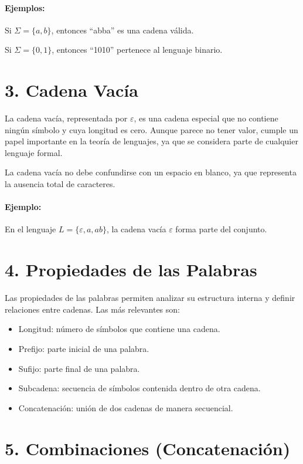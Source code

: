 \documentclass{article}
\begin{document}
\paragraph{Ejemplos:}

Si $\Sigma = \{a, b\}$, entonces ``abba'' es una cadena válida.

Si $\Sigma = \{0, 1\}$, entonces ``1010'' pertenece al lenguaje binario.

\section{3. Cadena Vacía}

La cadena vacía, representada por $\varepsilon$, es una cadena especial que no contiene ningún símbolo y cuya longitud es cero.
Aunque parece no tener valor, cumple un papel importante en la teoría de lenguajes, ya que se considera parte de cualquier lenguaje formal.

La cadena vacía no debe confundirse con un espacio en blanco, ya que representa la ausencia total de caracteres.

\paragraph{Ejemplo:}

En el lenguaje $L = \{\varepsilon, a, ab\}$, la cadena vacía $\varepsilon$ forma parte del conjunto.

\section{4. Propiedades de las Palabras}

Las propiedades de las palabras permiten analizar su estructura interna y definir relaciones entre cadenas.
Las más relevantes son:

\begin{itemize}
  \item Longitud: número de símbolos que contiene una cadena.
  \item Prefijo: parte inicial de una palabra.
  \item Sufijo: parte final de una palabra.
  \item Subcadena: secuencia de símbolos contenida dentro de otra cadena.
  \item Concatenación: unión de dos cadenas de manera secuencial.
\end{itemize}

\section{5. Combinaciones (Concatenación)}
\end{document}
